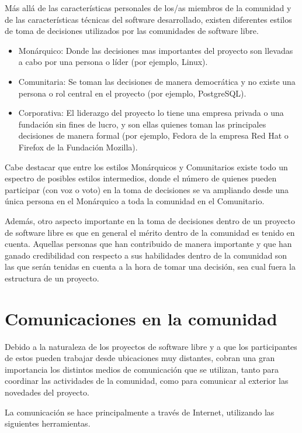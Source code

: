 Más allá de las características personales de los/as miembros de la comunidad y de las características técnicas del software desarrollado, existen diferentes estilos de toma de decisiones utilizados por las comunidades de software libre.

\begin{itemize}
\item Monárquico: Donde las decisiones mas importantes del proyecto son llevadas a cabo por una persona o líder (por ejemplo, Linux).
\item Comunitaria: Se toman las decisiones de manera democrática y no existe una persona o rol central en el proyecto (por ejemplo, PostgreSQL).
\item Corporativa: El liderazgo del proyecto lo tiene una empresa privada o una fundación sin fines de lucro, y son ellas quienes toman las principales decisiones de manera formal (por ejemplo, Fedora de la empresa Red Hat o Firefox de la Fundación Mozilla).
\end{itemize}

Cabe destacar que entre los estilos Monárquicos y Comunitarios existe todo un espectro de posibles estilos intermedios, donde el número de quienes pueden participar (con voz o voto) en la toma de decisiones se va ampliando desde una única persona en el Monárquico a toda la comunidad en el Comunitario.

Además, otro aspecto importante en la toma de decisiones dentro de un proyecto de software libre es que en general el mérito dentro de la comunidad es tenido en cuenta. Aquellas personas que han contribuido de manera importante y que han ganado credibilidad con respecto a sus habilidades dentro de la comunidad son las que serán tenidas en cuenta a la hora de tomar una decisión, sea cual fuera la estructura de un proyecto.

\section{Comunicaciones en la comunidad}

Debido a la naturaleza de los proyectos de software libre y a que los participantes de estos pueden trabajar desde ubicaciones muy distantes, cobran una gran importancia los distintos medios de comunicación que se utilizan, tanto para coordinar las actividades de la comunidad, como para comunicar al exterior las novedades del proyecto.

La comunicación se hace principalmente a través de Internet, utilizando las siguientes herramientas.

